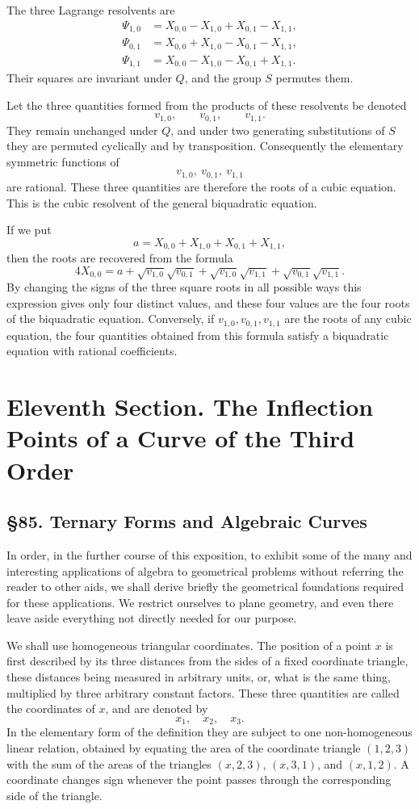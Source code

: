 \documentclass[11pt,a4paper]{book}
\newcommand{\webersection}[2]{\clearpage\section*{\S #1. #2}}
\newcommand{\booktitle}[1]{\clearpage\chapter*{#1}}
\begin{document}
The three Lagrange resolvents are
\[
\begin{aligned}
 \Psi_{1,0}&=X_{0,0}-X_{1,0}+X_{0,1}-X_{1,1},\\
 \Psi_{0,1}&=X_{0,0}+X_{1,0}-X_{0,1}-X_{1,1},\\
 \Psi_{1,1}&=X_{0,0}-X_{1,0}-X_{0,1}+X_{1,1}.
\end{aligned}
\]
Their squares are invariant under \(Q\), and the group \(S\) permutes them.

Let the three quantities formed from the products of these resolvents be denoted
\[
 v_{1,0},\qquad v_{0,1},\qquad v_{1,1}.
\]
They remain unchanged under \(Q\), and under two generating substitutions of \(S\) they are permuted cyclically and by transposition.  Consequently the elementary symmetric functions of
\[
 v_{1,0},\ v_{0,1},\ v_{1,1}
\]
are rational.  These three quantities are therefore the roots of a cubic equation.  This is the cubic resolvent of the general biquadratic equation.

If we put
\[
 a=X_{0,0}+X_{1,0}+X_{0,1}+X_{1,1},
\]
then the roots are recovered from the formula
\[
 4X_{0,0}
 =
 a+\sqrt{v_{1,0}}\sqrt{v_{0,1}}
  +\sqrt{v_{1,0}}\sqrt{v_{1,1}}
  +\sqrt{v_{0,1}}\sqrt{v_{1,1}}.
\]
By changing the signs of the three square roots in all possible ways this expression gives only four distinct values, and these four values are the four roots of the biquadratic equation.  Conversely, if \(v_{1,0},v_{0,1},v_{1,1}\) are the roots of any cubic equation, the four quantities obtained from this formula satisfy a biquadratic equation with rational coefficients.


\booktitle{Eleventh Section. The Inflection Points of a Curve of the Third Order}

\webersection{85}{Ternary Forms and Algebraic Curves}

In order, in the further course of this exposition, to exhibit some of the many and interesting applications of algebra to geometrical problems without referring the reader to other aids, we shall derive briefly the geometrical foundations required for these applications.  We restrict ourselves to plane geometry, and even there leave aside everything not directly needed for our purpose.

We shall use homogeneous triangular coordinates.  The position of a point \(x\) is first described by its three distances from the sides of a fixed coordinate triangle, these distances being measured in arbitrary units, or, what is the same thing, multiplied by three arbitrary constant factors.  These three quantities are called the coordinates of \(x\), and are denoted by
\[
x_1,\quad x_2,\quad x_3.
\]
In the elementary form of the definition they are subject to one non-homogeneous linear relation, obtained by equating the area of the coordinate triangle \((1,2,3)\) with the sum of the areas of the triangles \((x,2,3)\), \((x,3,1)\), and \((x,1,2)\).  A coordinate changes sign whenever the point passes through the corresponding side of the triangle.
\end{document}
